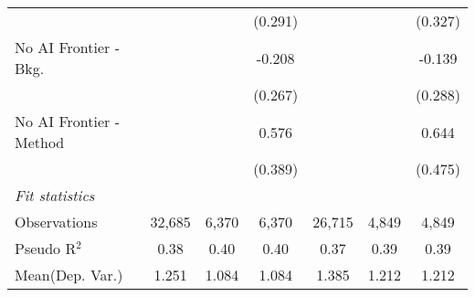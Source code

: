 \begin{tabular}{lcccccc}
                           &               &         & (0.291)       &             &         & (0.327)\\   
   No AI Frontier - Bkg.   &               &         & -0.208        &             &         & -0.139\\   
                           &               &         & (0.267)       &             &         & (0.288)\\   
   No AI Frontier - Method &               &         & 0.576         &             &         & 0.644\\   
                           &               &         & (0.389)       &             &         & (0.475)\\   
   \midrule
   \emph{Fit statistics}\\
   Observations            & 32,685        & 6,370   & 6,370         & 26,715      & 4,849   & 4,849\\  
   Pseudo R$^2$            & 0.38          & 0.40    & 0.40          & 0.37        & 0.39    & 0.39\\  
Mean(Dep. Var.) & 1.251 & 1.084 & 1.084 & 1.385 & 1.212 & 1.212 \\
   

\end{tabular}
